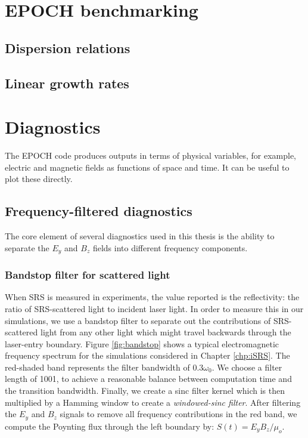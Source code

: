 \section{EPOCH benchmarking}
\subsection{Dispersion relations}
\subsection{Linear growth rates}



\section{Diagnostics}



The EPOCH code produces outputs in terms of physical variables, for example, electric and magnetic fields as functions of space and time. It can be useful to plot these directly.

\subsection{Frequency-filtered diagnostics}
The core element of several diagnostics used in this thesis is the ability to separate the $E_y$ and $B_z$ fields into different frequency components. 

\subsubsection{Bandstop filter for scattered light} When SRS is measured in experiments, the value reported is the reflectivity: the ratio of SRS-scattered light to incident laser light. In order to measure this in our simulations, we use a bandstop filter to separate out the contributions of SRS-scattered light from any other light which might travel backwards through the laser-entry boundary. Figure \ref{fig:bandstop} shows a typical electromagnetic frequency spectrum for the simulations considered in Chapter \ref{chp:iSRS}. The red-shaded band represents the filter bandwidth of $0.3\omega_0$. We choose a filter length of 1001, to achieve a reasonable balance between computation time and the transition bandwidth. Finally, we create a sinc filter kernel which is then multiplied by a Hamming window to create a \textit{windowed-sinc filter}. After filtering the $E_y$ and $B_z$ signals to remove all frequency contributions in the red band, we compute the Poynting flux through the left boundary by: $S(t)=E_yB_z/\mu_o$.


